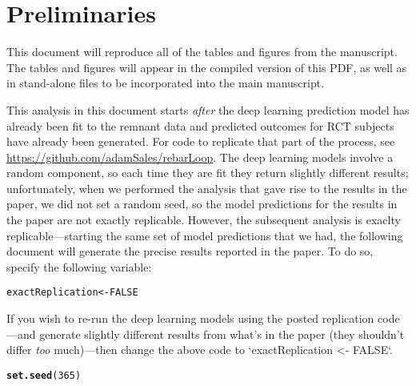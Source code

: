 \documentclass[12pt]{article}\usepackage[]{graphicx}\usepackage[]{xcolor}
\makeatletter
\newcommand{\hlnum}[1]{\textcolor[rgb]{0.686,0.059,0.569}{#1}}%
\newcommand{\hlstd}[1]{\textcolor[rgb]{0.345,0.345,0.345}{#1}}%
\newcommand{\hlkwb}[1]{\textcolor[rgb]{0.69,0.353,0.396}{#1}}%
\newcommand{\hlkwd}[1]{\textcolor[rgb]{0.737,0.353,0.396}{\textbf{#1}}}%
\newenvironment{kframe}{%
 \def\at@end@of@kframe{}%
 \ifinner\ifhmode%
  \def\at@end@of@kframe{\end{minipage}}%
  \begin{minipage}{\columnwidth}%
 \fi\fi%
 \def\FrameCommand##1{\hskip\@totalleftmargin \hskip-\fboxsep
 \colorbox{shadecolor}{##1}\hskip-\fboxsep
     \hskip-\linewidth \hskip-\@totalleftmargin \hskip\columnwidth}%
 \MakeFramed {\advance\hsize-\width
   \@totalleftmargin\z@ \linewidth\hsize
   \@setminipage}}%
 {\par\unskip\endMakeFramed%
 \at@end@of@kframe}
\newenvironment{knitrout}{}{} %
\makeatother
\begin{document}
\section{Preliminaries}

This document will reproduce all of the tables and figures from the
manuscript. The tables and figures will appear in the compiled version
of this PDF, as well as in stand-alone files to be incorporated into
the main manuscript.


This analysis in this document starts \emph{after} the deep learning prediction model has already been fit to the remnant data and predicted outcomes for RCT subjects have already been generated. For code to replicate that part of the process, see \url{https://github.com/adamSales/rebarLoop}. 
The deep learning models involve a random component, so each time they are fit they return slightly different results; unfortunately, when we performed the analysis that gave rise to the results in the paper, we did not set a random seed, so the model predictions for the results in the paper are not exactly replicable. 
However, the subsequent analysis is exaclty replicable---starting the same set of model predictions that we had, the following document will generate the precise results reported in the paper. 
To do so, specify the following variable:

\begin{knitrout}
\color{fgcolor}\begin{kframe}
\begin{alltt}
\hlstd{exactReplication} \hlkwb{<-} \hlnum{FALSE}
\end{alltt}
\end{kframe}
\end{knitrout}

If you wish to re-run the deep learning models using the posted replication code---and generate slightly different results from what's in the paper (they shouldn't differ \emph{too} much)---then change the above code to `exactReplication <- FALSE`.


\begin{knitrout}
\color{fgcolor}\begin{kframe}
\begin{alltt}
\hlkwd{set.seed}\hlstd{(}\hlnum{365}\hlstd{)}
\end{alltt}
\end{kframe}
\end{knitrout}
\end{document}
